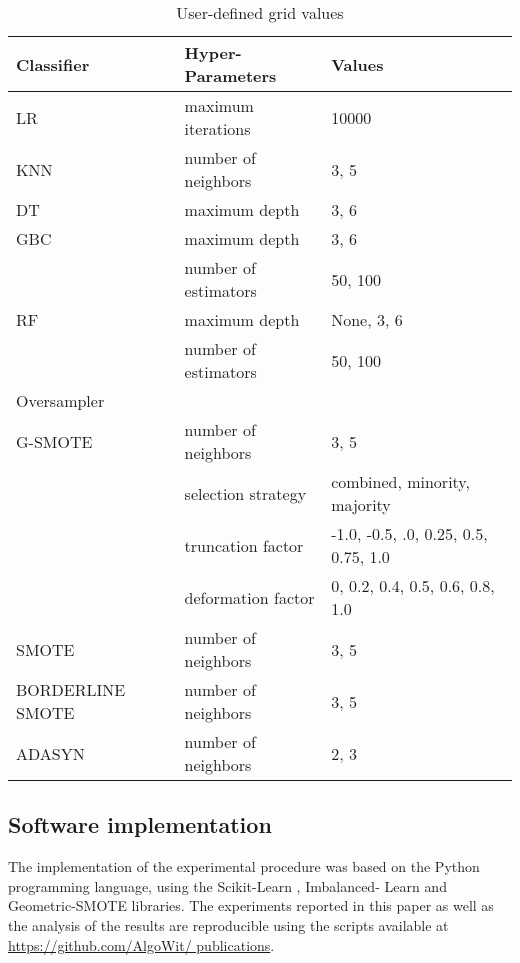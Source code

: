 \documentclass[remotesensing,article,submit,moreauthors,pdftex]{Definitions/mdpi}
\begin{document}
\begin{table}[H]
	\centering
	\begin{tabular}{lll}
		\toprule
		Classifier       & Hyper-Parameters & Values\\
		\hline
		LR               & maximum iterations   & 10000   \\
		KNN              & number of neighbors  & {3, 5} \\
		DT               & maximum depth        & {3, 6} \\
		GBC              & maximum depth        & {3, 6} \\
    			 		 & number of estimators & {50, 100} \\
		RF               & maximum depth        & {None, 3, 6} \\
				 		 & number of estimators & {50, 100} \\
		\toprule
		Oversampler      &                      & \\
		\hline
		G-SMOTE          & number of neighbors  & {3, 5} \\
				 		 & selection strategy   & combined, minority, majority\\
				 		 & truncation factor    & {-1.0, -0.5, .0, 0.25, 0.5,
				 		 0.75, 1.0} \\
				 		 & deformation factor   & {0, 0.2, 0.4, 0.5, 0.6, 0.8,
				 		 1.0} \\
 		SMOTE            & number of neighbors & {3, 5} \\
		BORDERLINE SMOTE & number of neighbors & {3, 5} \\
		ADASYN           & number of neighbors & {2, 3} \\
		\bottomrule
	\end{tabular}
	\caption{\label{tab:grid}User-defined grid values}
\end{table}

\subsection{Software implementation}

The implementation of the experimental procedure was based on the Python
programming language, using the Scikit-Learn \cite{Pedregosa2011}, Imbalanced-
Learn \cite{JMLR:v18:16-365} and Geometric-SMOTE \cite{Douzas2019} libraries.
The experiments reported in this paper as well as the analysis of the results
are reproducible using the scripts available at \url{https://github.com/AlgoWit/
publications}.
\end{document}
